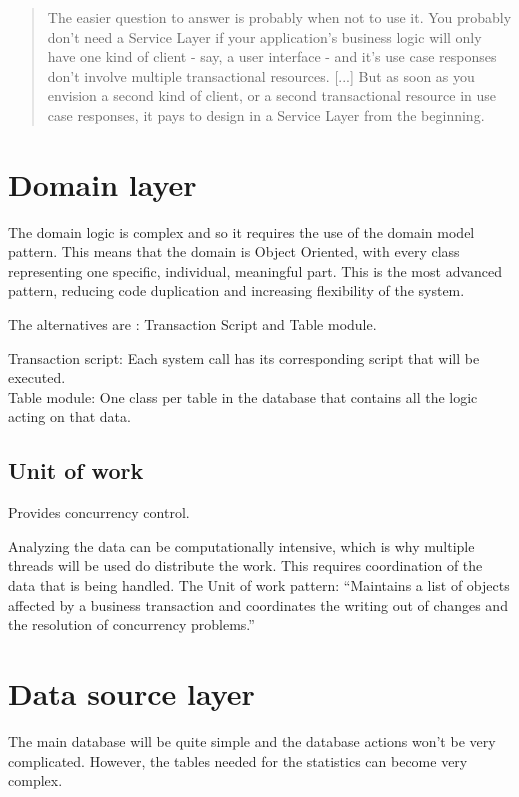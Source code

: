 \begin{quotation}
The easier question to answer is probably when not to use it. You probably don't need a Service Layer if your application's business logic will only have one kind of client - say, a user interface - and it's use case responses don't involve multiple transactional resources. [...]
But as soon as you envision a second kind of client, or a second transactional resource in use case responses, it pays to design in a Service Layer from the beginning.
\end{quotation}

\section{Domain layer}
The domain logic is complex and so it requires the use of the domain model pattern. This means that the domain is Object Oriented, with every class representing one specific, individual, meaningful part.
This is the most advanced pattern, reducing code duplication and increasing flexibility of the system.

The alternatives are : Transaction Script and Table module.

Transaction script: Each system call has its corresponding script that will be executed.\\
Table module: One class per table in the database that contains all the logic acting on that data.

\subsection{Unit of work}

Provides concurrency control.

Analyzing the data can be computationally intensive, which is why multiple threads will be used do distribute the work. This requires coordination of the data that is being handled. The Unit of work pattern: ``Maintains a list of objects affected by a business transaction and coordinates the writing out of changes and the resolution of concurrency problems.''

\section{Data source layer}
The main database will be quite simple and the database actions won't be very complicated. However, the tables needed for the statistics can become very complex.

